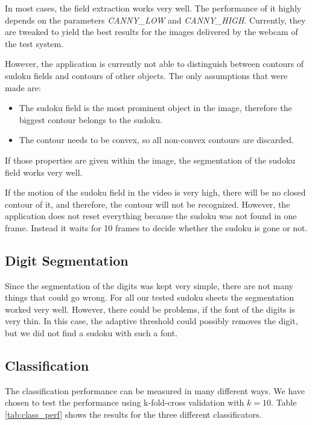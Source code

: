 \documentclass[
a4paper,     %
12pt         %
]{scrartcl}  %
\begin{document}
In most cases, the field extraction works very well. The performance of it highly depends on the 
parameters \emph{CANNY\_LOW} and \emph{CANNY\_HIGH}. Currently, they are tweaked to yield the best
results for the images delivered by the webcam of the test system.

However, the application is currently not able to distinguish between contours of sudoku fields and
contours of other objects. The only assumptions that were made are:

\begin{itemize}
  \item The sudoku field is the most prominent object in the image, therefore the biggest contour
  belongs to the sudoku.
  \item The contour needs to be convex, so all non-convex contours are discarded.
\end{itemize}

If those properties are given within the image, the segmentation of the sudoku field works very well. 

If the motion of the sudoku field in the video is very high, there will be no closed contour of it,
and therefore, the contour will not be recognized. However, the application does not reset everything because
the sudoku was not found in one frame. Instead it waits for 10 frames to decide whether the sudoku is gone
or not.

\subsection{Digit Segmentation}

\label{sec:class_perf}
 
Since the segmentation of the digits was kept very simple, there are not many things that could go
wrong. For all our tested sudoku sheets the segmentation worked very well. However, there could
be problems, if the font of the digits is very thin. In this case, the adaptive threshold could
possibly removes the digit, but we did not find a sudoku with such a font.

\subsection{Classification}

The classification performance can be measured in many different ways. We have chosen to test the
performance using k-fold-cross validation with $k=10$. Table \ref{tab:class_perf} shows the results
for the three different classificators.
\end{document}
